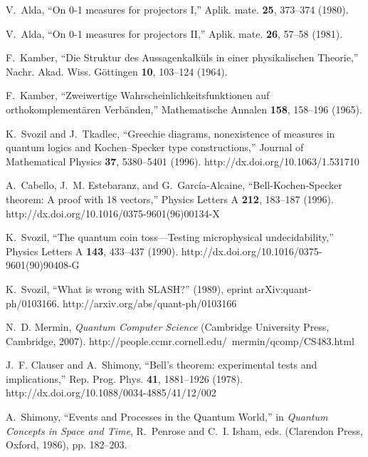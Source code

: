 \documentclass[fleqn,twoside]{article}      %
\begin{document}
\begin{thebibliography}{10}
V.~Alda, \enquote{On\/ {\rm 0-1} measures for projectors I,} Aplik. mate. {\bf
  25}, 373--374 (1980).

V.~Alda, \enquote{On\/ {\rm 0-1} measures for projectors II,} Aplik. mate. {\bf
  26}, 57--58 (1981).

F.~Kamber, \enquote{Die {S}truktur des {A}ussagenkalk{\"{u}}ls in einer
  physikalischen {T}heorie,} Nachr. Akad. Wiss. G{\"{o}}ttingen {\bf 10},
  103--124 (1964).

F.~Kamber, \enquote{Zweiwertige {W}ahrscheinlichkeitsfunktionen auf
  orthokomplement{\"{a}}ren {V}erb{\"{a}}nden,} Mathematische Annalen {\bf
  158}, 158--196 (1965).

K.~Svozil and J.~Tkadlec, \enquote{Greechie diagrams, nonexistence of measures
  in quantum logics and {K}ochen--{S}pecker type constructions,} Journal of
  Mathematical Physics {\bf 37}, 5380--5401 (1996).
\newline http://dx.doi.org/10.1063/1.531710

A.~Cabello, J.~M. Estebaranz, and G.~Garc{\'{i}}a-Alcaine,
  \enquote{{B}ell-{K}ochen-{S}pecker theorem: A proof with 18 vectors,} Physics
  Letters A {\bf 212}, 183--187 (1996).
\newline http://dx.doi.org/10.1016/0375-9601(96)00134-X

K.~Svozil, \enquote{The quantum coin toss---Testing microphysical
  undecidability,} Physics Letters A {\bf 143}, 433--437 (1990).
\newline http://dx.doi.org/10.1016/0375-9601(90)90408-G

K.~Svozil, \enquote{What is wrong with {SLASH}?}  (1989), eprint
  arXiv:quant-ph/0103166.
\newline http://arxiv.org/abs/quant-ph/0103166

N.~D. Mermin, {\em Quantum Computer Science\/} (Cambridge University Press,
  Cambridge, 2007).
\newline http://people.ccmr.cornell.edu/~mermin/qcomp/CS483.html

J.~F. Clauser and A.~Shimony, \enquote{{B}ell's theorem: experimental tests and
  implications,} Rep. Prog. Phys. {\bf 41}, 1881--1926 (1978).
\newline http://dx.doi.org/10.1088/0034-4885/41/12/002

A.~Shimony, \enquote{Events and Processes in the Quantum World,} in {\em
  Quantum Concepts in Space and Time\/}, R.~Penrose and C.~I. Isham, eds.
  (Clarendon Press, Oxford, 1986), pp. 182--203.


\end{thebibliography}
\end{document}
